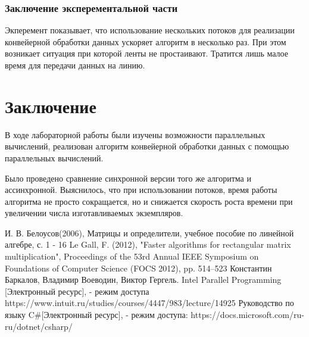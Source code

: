 \documentclass[12pt]{report}
\begin{document}
\newpage
\subsection{Заключение эксперементальной части}
Экперемент показывает, что использование нескольких потоков для реализации конвейерной обработки данных ускоряет алгоритм в несколько раз. При этом возникает ситуация при которой ленты не простаивают. Тратится лишь малое время для передачи данных на линию.
\chapter*{Заключение}
В ходе лабораторной работы были изучены возможности параллельных вычислений, реализован алгоритм конвейерной обработки данных
с помощью параллельных вычислений.

Было проведено сравнение синхронной версии того же алгоритма и ассинхронной. Выяснилось, что при использовании потоков, время работы алгоритма не просто сокращается, но и снижается скорость роста времени при увеличении числа изготавливаемых экземпляров.

\begin{thebibliography}{3}
	И. В. Белоусов(2006), Матрицы и определители, учебное пособие по линейной алгебре, с. 1 - 16
	Le Gall, F. (2012), "Faster algorithms for rectangular matrix multiplication", Proceedings of the 53rd Annual IEEE Symposium on Foundations of Computer Science (FOCS 2012), pp. 514–523
	Константин Баркалов, Владимир Воеводин, Виктор Гергель. Intel Parallel Programming [Электронный ресурс], - режим доступа https://www.intuit.ru/studies/courses/4447/983/lecture/14925
	Руководство по языку C\#[Электронный ресурс], - режим доступа: https://docs.microsoft.com/ru-ru/dotnet/csharp/
\end{thebibliography}
\end{document}
